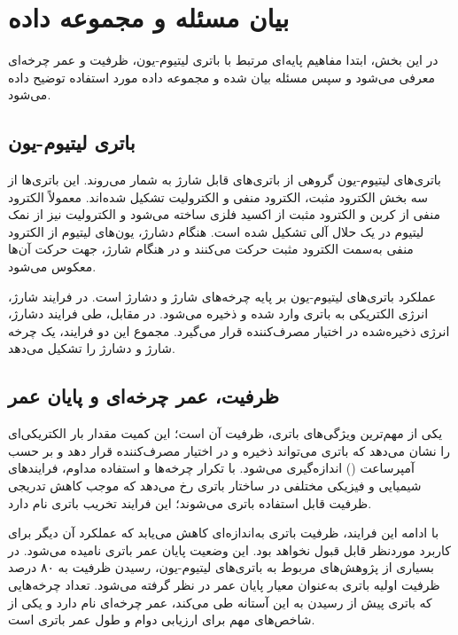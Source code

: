 \section{بیان مسئله و مجموعه داده}
\label{sec:dataset}

در این بخش، ابتدا مفاهیم پایه‌ای مرتبط با باتری لیتیوم-یون، ظرفیت و عمر چرخه‌ای معرفی می‌شود و سپس مسئله بیان شده و مجموعه داده مورد استفاده توضیح داده می‌شود.


\subsection{باتری لیتیوم-یون}

باتری‌های لیتیوم-یون گروهی از باتری‌های قابل شارژ به شمار می‌روند. این باتری‌ها از سه بخش الکترود مثبت، الکترود منفی و الکترولیت تشکیل شده‌اند. معمولاً الکترود منفی از کربن و الکترود مثبت از اکسید فلزی ساخته می‌شود و الکترولیت نیز از نمک لیتیوم در یک حلال آلی تشکیل شده است. هنگام دشارژ، یون‌های لیتیوم از الکترود منفی به‌سمت الکترود مثبت حرکت می‌کنند و در هنگام شارژ، جهت حرکت آن‌ها معکوس می‌شود.

عملکرد باتری‌های لیتیوم-یون بر پایه چرخه‌های شارژ و دشارژ است. در فرایند شارژ، انرژی الکتریکی به باتری وارد شده و ذخیره می‌شود. در مقابل، طی فرایند دشارژ، انرژی ذخیره‌شده در اختیار مصرف‌کننده قرار می‌گیرد. مجموع این دو فرایند، یک چرخه شارژ و دشارژ را تشکیل می‌دهد.

\subsection{ظرفیت، عمر چرخه‌ای و پایان عمر}

یکی از مهم‌ترین ویژگی‌های باتری، ظرفیت آن است؛ این کمیت مقدار بار الکتریکی‌ای را نشان می‌دهد که باتری می‌تواند ذخیره و در اختیار مصرف‌کننده قرار دهد و بر حسب آمپرساعت () اندازه‌گیری می‌شود. با تکرار چرخه‌ها و استفاده مداوم، فرایندهای شیمیایی و فیزیکی مختلفی در ساختار باتری رخ می‌دهد که موجب کاهش تدریجی ظرفیت قابل استفاده باتری می‌شوند؛ این فرایند تخریب باتری نام دارد.

با ادامه این فرایند، ظرفیت باتری به‌اندازه‌ای کاهش می‌یابد که عملکرد آن دیگر برای کاربرد موردنظر قابل قبول نخواهد بود. این وضعیت پایان عمر باتری نامیده می‌شود. در بسیاری از پژوهش‌های مربوط به باتری‌های لیتیوم-یون، رسیدن ظرفیت به ۸۰ درصد ظرفیت اولیه باتری به‌عنوان معیار پایان عمر در نظر گرفته می‌شود. تعداد چرخه‌هایی که باتری پیش از رسیدن به این آستانه طی می‌کند، عمر چرخه‌ای نام دارد و یکی از شاخص‌های مهم برای ارزیابی دوام و طول عمر باتری است.
